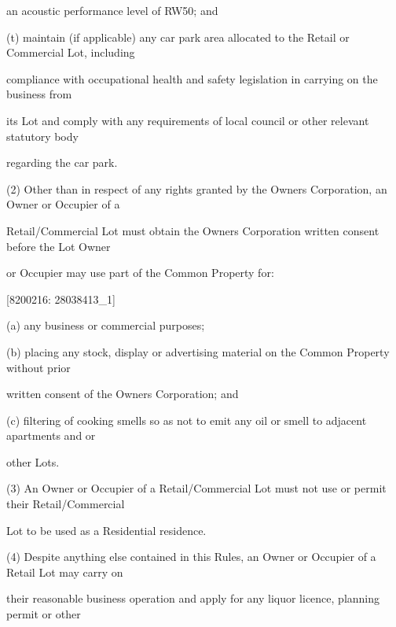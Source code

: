 \documentclass{article}
\begin{document}
{\fontsize{10.02}{1}an acoustic performance level of RW50; and }

{\fontsize{9.962}{1}(t) maintain (if applicable) any car park area allocated to the Retail or Commercial Lot, including }

{\fontsize{10.02}{1}compliance with occupational health and safety legislation in carrying on the business from }

{\fontsize{10.02}{1}its Lot and comply with any requirements of local council or other relevant statutory body }

{\fontsize{10.02}{1}regarding the car park. }

{\fontsize{9.962}{1}(2) Other than in respect of any rights granted by the Owners Corporation, an Owner or Occupier of a }

{\fontsize{10.02}{1}Retail/Commercial Lot must obtain the Owners Corporation written consent before the Lot Owner }

{\fontsize{10.02}{1}or Occupier may use part of the Common Property for: }

\newpage
















{\fontsize{7.02}{1}[8200216: 28038413\_1] }

{\fontsize{9.962}{1}(a) any business or commercial purposes; }

{\fontsize{9.962}{1}(b) placing any stock, display or advertising material on the Common Property without prior }

{\fontsize{10.02}{1}written consent of the Owners Corporation; and }

{\fontsize{9.962}{1}(c) filtering of cooking smells so as not to emit any oil or smell to adjacent apartments and or }

{\fontsize{10.02}{1}other Lots. }

{\fontsize{9.962}{1}(3) An Owner or Occupier of a Retail/Commercial Lot must not use or permit their Retail/Commercial }

{\fontsize{10.02}{1}Lot to be used as a Residential residence. }

{\fontsize{9.962}{1}(4) Despite anything else contained in this Rules, an Owner or Occupier of a Retail Lot may carry on }

{\fontsize{10.02}{1}their reasonable business operation and apply for any liquor licence, planning permit or other }
\end{document}
